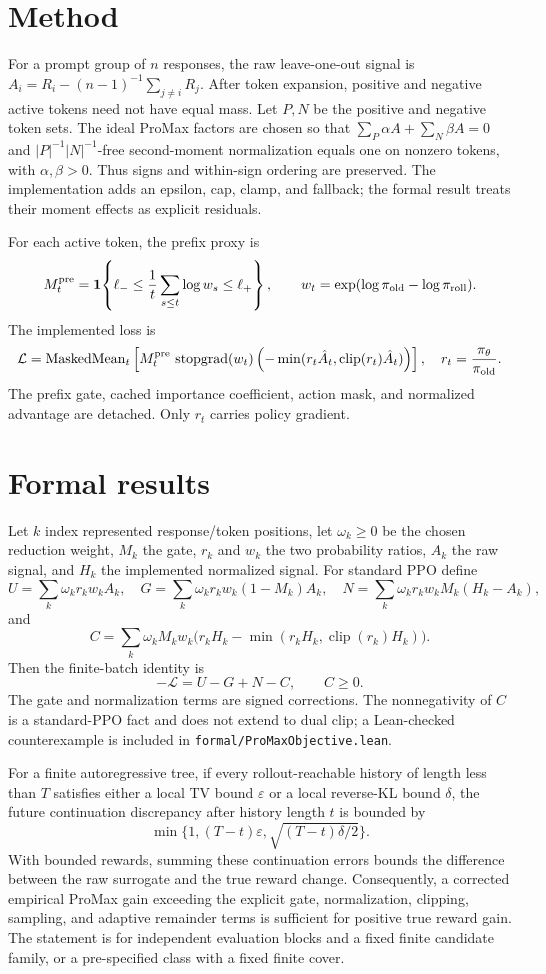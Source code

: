 \documentclass[10pt]{article}
\begin{document}
\section{Method}
For a prompt group of $n$ responses, the raw leave-one-out signal is
$A_i=R_i-(n-1)^{-1}\sum_{j\ne i}R_j$. After token expansion, positive and
negative active tokens need not have equal mass. Let $P,N$ be the positive and
negative token sets. The ideal ProMax factors are chosen so that
$\sum_{P}\alpha A+\sum_N\beta A=0$ and
$|P|^{-1}|N|^{-1}$-free second-moment normalization equals one on nonzero
tokens, with $\alpha,\beta>0$. Thus signs and within-sign ordering are
preserved. The implementation adds an epsilon, cap, clamp, and fallback; the
formal result treats their moment effects as explicit residuals.

For each active token, the prefix proxy is
\[
 M_t^{\rm pre}=\mathbf 1\!\left\{
 \ell_-\le \frac{1}{t}\sum_{s\le t}\log w_s\le \ell_+\right\},
 \qquad w_t=\exp(\log\pi_{\rm old}-\log\pi_{\rm roll}).
\]
The implemented loss is
\[
 \mathcal L=\operatorname{MaskedMean}_t\left[
 M_t^{\rm pre}\,\operatorname{stopgrad}(w_t)
 \left(-\min(r_t\hat A_t,\operatorname{clip}(r_t)\hat A_t)\right)\right],
\quad r_t=\frac{\pi_\theta}{\pi_{\rm old}}.
\]
The prefix gate, cached importance coefficient, action mask, and normalized
advantage are detached. Only $r_t$ carries policy gradient.

\section{Formal results}
Let $k$ index represented response/token positions, let $\omega_k\ge0$ be the
chosen reduction weight, $M_k$ the gate, $r_k$ and $w_k$ the two probability
ratios, $A_k$ the raw signal, and $H_k$ the implemented normalized signal. For
standard PPO define
\[
 U=\sum_k\omega_k r_kw_kA_k,\quad
 G=\sum_k\omega_k r_kw_k(1-M_k)A_k,\quad
 N=\sum_k\omega_k r_kw_kM_k(H_k-A_k),
\]
and
\[
 C=\sum_k\omega_kM_kw_k\bigl(r_kH_k-
 \min(r_kH_k,\operatorname{clip}(r_k)H_k)\bigr).
\]
Then the finite-batch identity is
\[
 -\mathcal L=U-G+N-C,\qquad C\ge0.
\]
The gate and normalization terms are signed corrections. The nonnegativity of
$C$ is a standard-PPO fact and does not extend to dual clip; a Lean-checked
counterexample is included in \texttt{formal/ProMaxObjective.lean}.

For a finite autoregressive tree, if every rollout-reachable history of length
less than $T$ satisfies either a local TV bound $\varepsilon$ or a local
reverse-KL bound $\delta$, the future continuation discrepancy after history
length $t$ is bounded by
\[
 \min\{1,(T-t)\varepsilon,\sqrt{(T-t)\delta/2}\}.
\]
With bounded rewards, summing these continuation errors bounds the difference
between the raw surrogate and the true reward change. Consequently, a
corrected empirical ProMax gain exceeding the explicit gate, normalization,
clipping, sampling, and adaptive remainder terms is sufficient for positive
true reward gain. The statement is for independent evaluation blocks and a
fixed finite candidate family, or a pre-specified class with a fixed finite
cover.
\end{document}
